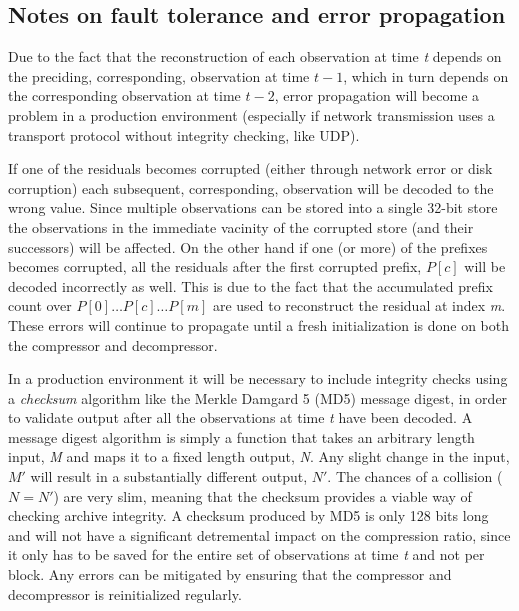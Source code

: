   \subsection{Notes on fault tolerance and error propagation}
    Due to the fact that the reconstruction of each observation at time \textit{t} depends on the preciding, corresponding, observation at time $t-1$, which in turn 
    depends on the corresponding observation at time $t-2$, error propagation will become a problem in a production environment (especially if network transmission uses a transport
    protocol without integrity checking, like UDP). 
  
    If one of the residuals becomes corrupted (either through network error or disk corruption) each subsequent, corresponding, 
    observation will be decoded to the wrong value. Since multiple observations can be stored into a single 32-bit store the observations in the immediate vacinity of the corrupted
    store (and their successors) will be affected. On the other hand if one (or more) of the prefixes becomes corrupted, all the residuals after the first corrupted prefix, $P[c]$ will be decoded 
    incorrectly as well. This is due to the fact that the accumulated prefix count over $P[0]\dots P[c]\dots P[m]$ are used to reconstruct the residual at index \textit{m}. These 
    errors will continue to propagate until a fresh initialization is done on both the compressor and decompressor. 
    
    In a production environment it will be necessary to include integrity checks using a \textit{checksum} algorithm like the Merkle Damgard 5 (MD5) message digest, in order to validate output after all the observations
    at time \textit{t} have been decoded. A message digest algorithm is simply a function that takes an arbitrary length input, \textit{M} and maps it to a fixed length output, 
    \textit{N}. Any slight change in the input, $M'$ will result in a substantially different output, $N'$. The chances of a collision ($N = N'$) are very slim, meaning that 
    the checksum provides a viable way of checking archive integrity. A checksum produced by MD5 is only 128 bits long and will not have a significant detremental impact on the
    compression ratio, since it only has to be saved for the entire set of observations at time \textit{t} and not per block. Any errors can be mitigated by ensuring that the 
    compressor and decompressor is reinitialized regularly.
